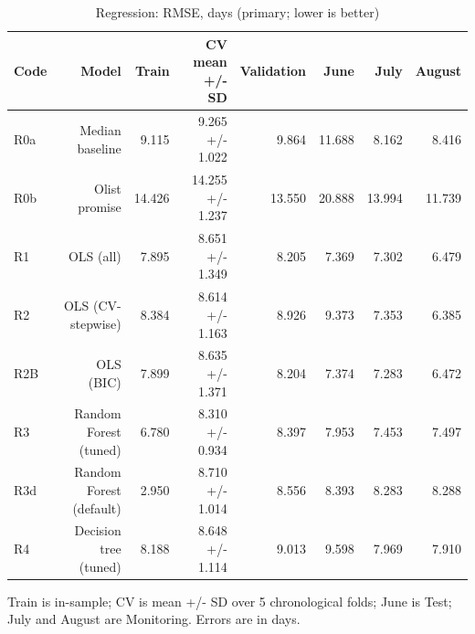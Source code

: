 \begin{table}[htbp]
\centering
\small
\caption{Regression: RMSE, days (primary; lower is better)}
\begin{tabular}{lrrrrrrr}
\toprule
Code & Model & Train & CV mean +/- SD & Validation & June & July & August \\
\midrule
R0a & Median baseline & 9.115 & 9.265 +/- 1.022 & 9.864 & 11.688 & 8.162 & 8.416 \\
R0b & Olist promise & 14.426 & 14.255 +/- 1.237 & 13.550 & 20.888 & 13.994 & 11.739 \\
R1 & OLS (all) & 7.895 & 8.651 +/- 1.349 & 8.205 & 7.369 & 7.302 & 6.479 \\
R2 & OLS (CV-stepwise) & 8.384 & 8.614 +/- 1.163 & 8.926 & 9.373 & 7.353 & 6.385 \\
R2B & OLS (BIC) & 7.899 & 8.635 +/- 1.371 & 8.204 & 7.374 & 7.283 & 6.472 \\
R3 & Random Forest (tuned) & 6.780 & 8.310 +/- 0.934 & 8.397 & 7.953 & 7.453 & 7.497 \\
R3d & Random Forest (default) & 2.950 & 8.710 +/- 1.014 & 8.556 & 8.393 & 8.283 & 8.288 \\
R4 & Decision tree (tuned) & 8.188 & 8.648 +/- 1.114 & 9.013 & 9.598 & 7.969 & 7.910 \\
\bottomrule
\end{tabular}
\par\smallskip\begin{minipage}{\linewidth}\footnotesize Train is in-sample; CV is mean +/- SD over 5 chronological folds; June is Test; July and August are Monitoring. Errors are in days.\end{minipage}
\end{table}


